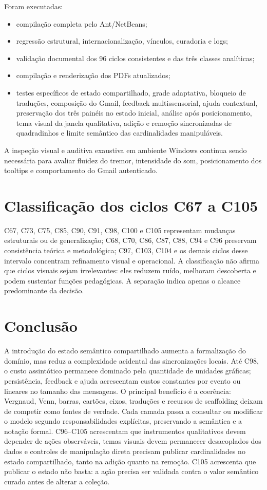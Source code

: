 \documentclass[12pt,a4paper]{article}
\begin{document}
Foram executadas:
\begin{itemize}[noitemsep]
  \item compilação completa pelo Ant/NetBeans;
  \item regressão estrutural, internacionalização, vínculos, curadoria e logs;
  \item validação documental dos 96 ciclos consistentes e das três classes analíticas;
  \item compilação e renderização dos PDFs atualizados;
  \item testes específicos de estado compartilhado, grade adaptativa, bloqueio de traduções, composição do Gmail, feedback multissensorial, ajuda contextual, preservação dos três painéis no estado inicial, análise após posicionamento, tema visual da janela qualitativa, adição e remoção sincronizadas de quadradinhos e limite semântico das cardinalidades manipuláveis.
\end{itemize}

A inspeção visual e auditiva exaustiva em ambiente Windows continua sendo necessária para avaliar fluidez do tremor, intensidade do som, posicionamento dos tooltips e comportamento do Gmail autenticado.

\section{Classificação dos ciclos C67 a C105}

C67, C73, C75, C85, C90, C91, C98, C100 e C105 representam mudanças estruturais ou de generalização; C68, C70, C86, C87, C88, C94 e C96 preservam consistência teórica e metodológica; C97, C103, C104 e os demais ciclos desse intervalo concentram refinamento visual e operacional. A classificação não afirma que ciclos visuais sejam irrelevantes: eles reduzem ruído, melhoram descoberta e podem sustentar funções pedagógicas. A separação indica apenas o alcance predominante da decisão.

\section{Conclusão}

A introdução do estado semântico compartilhado aumenta a formalização do domínio, mas reduz a complexidade acidental das sincronizações locais. Até C98, o custo assintótico permanece dominado pela quantidade de unidades gráficas; persistência, feedback e ajuda acrescentam custos constantes por evento ou lineares no tamanho das mensagens. O principal benefício é a coerência: Vergnaud, Venn, barras, cartões, eixos, traduções e recursos de scaffolding deixam de competir como fontes de verdade. Cada camada passa a consultar ou modificar o modelo segundo responsabilidades explícitas, preservando a semântica e a notação formal. C96--C105 acrescentam que instrumentos qualitativos devem depender de ações observáveis, temas visuais devem permanecer desacoplados dos dados e controles de manipulação direta precisam publicar cardinalidades no estado compartilhado, tanto na adição quanto na remoção. C105 acrescenta que publicar o estado não basta: a ação precisa ser validada contra o valor semântico curado antes de alterar a coleção.
\end{document}
